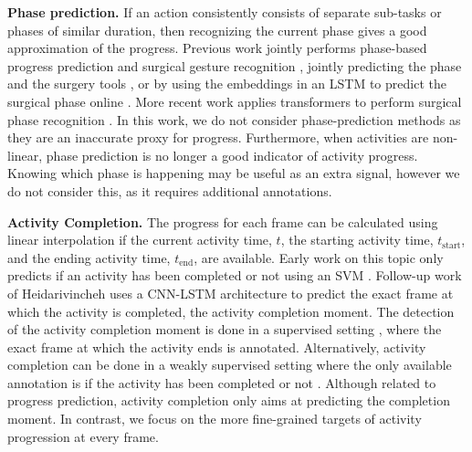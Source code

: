 \smallskip\noindent\textbf{Phase prediction.} If an action consistently consists of separate sub-tasks or phases of similar duration, then recognizing the current phase gives a good approximation of the progress.  
Previous work jointly performs phase-based progress prediction and surgical gesture recognition \cite{vanamsterdam2020}, jointly predicting the phase and the surgery tools \cite{twinanda2016}, or by using the embeddings in an LSTM to predict the surgical phase online \cite{yengera2018}. 
More recent work applies transformers to perform surgical phase recognition \cite{jamal2023, liu2023lovit}. In this work, we do not consider phase-prediction methods as they are an inaccurate proxy for progress. 
Furthermore, when activities are non-linear, phase prediction is no longer a good indicator of activity progress. 
Knowing which phase is happening may be useful as an extra signal, however we do not consider this, as it requires additional annotations.

\smallskip\noindent\textbf{Activity Completion.} The progress for each frame can be calculated using linear interpolation if the current activity time, $t$, the starting activity time, $t_\text{start}$, and the ending activity time, $t_\text{end}$, are available. Early work on this topic only predicts if an activity has been completed or not using an SVM \cite{heidarivincheh2016}. Follow-up work of Heidarivincheh \etal \cite{heidarivincheh2018} uses a CNN-LSTM architecture to predict the exact frame at which the activity is completed, \ie the activity completion moment. 
The detection of the activity completion moment is done in a supervised setting \cite{heidarivincheh2018}, where the exact frame at which the activity ends is annotated.
Alternatively, activity completion can be done in a weakly supervised setting where the only available annotation is if the activity has been completed or not \cite{heidarivincheh2019}. 
Although related to progress prediction, activity completion only aims at predicting the completion moment. In contrast, we focus on the more fine-grained targets of activity progression at every frame.


